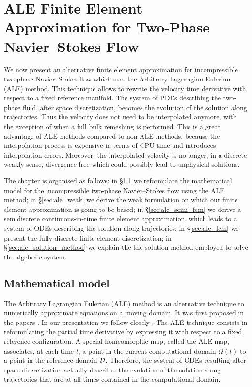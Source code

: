 \chapter[Two-Phase Navier--Stokes Flow ALE FEM]
{\sc ALE Finite Element Approximation for Two-Phase Navier--Stokes Flow}
\label{ch:ale}
We now present an alternative finite element approximation for incompressible
two-phase Navier--Stokes flow which uses the Arbitrary Lagrangian Eulerian (ALE)
method. This technique allows to rewrite the velocity time derivative with
respect to a fixed reference manifold. The system of PDEs describing the
two-phase fluid, after space discretization, becomes the evolution of the
solution along trajectories. Thus the velocity does not need to be interpolated
anymore, with the exception of when a full bulk remeshing is performed. This is
a great advantage of ALE methods compared to non-ALE methods, because the
interpolation process is expensive in terms of CPU time and introduces
interpolation errors. Moreover, the interpolated velocity is no longer, in a
discrete weakly sense, divergence-free which could possibly lead to unphysical
solutions.

The chapter is organised as follows: in \S\ref{sec:ale_model} we reformulate the
mathematical model for the incompressible two-phase Navier--Stokes flow using
the ALE method; in \S\ref{sec:ale_weak} we derive the weak formulation on
which our finite element approximation is going to be based; in
\S\ref{sec:ale_semi_fem} we derive a semidiscrete continuous-in-time finite
element approximation, which leads to a system of ODEs describing the solution
along trajectories; in \S\ref{sec:ale_fem} we present the fully discrete finite
element discretization; in \S\ref{sec:ale_solution_method} we explain the
the solution method employed to solve the algebraic system.

\section{Mathematical model}\label{sec:ale_model}
The Arbitrary Lagrangian Eulerian (ALE) method is an alternative technique to
numerically approximate equations on a moving domain. It was first proposed in
the papers \cite{Donea83,Hughes81}. In our presentation we follow closely
\cite{Nobile99,Formaggia04,NobilePhd}. The ALE technique consists in
reformulating
the partial time derivative by expressing it with respect to a fixed reference
configuration. A special homeomorphic map, called the ALE map, associates, at
each time $t$, a point in the current computational domain $\Omega(t)$ to a
point in the reference domain $\mathcal D$. Therefore, the system of ODEs resulting
after space discretization actually describes the evolution of the solution
along trajectories that are at all times contained in the computational domain.

